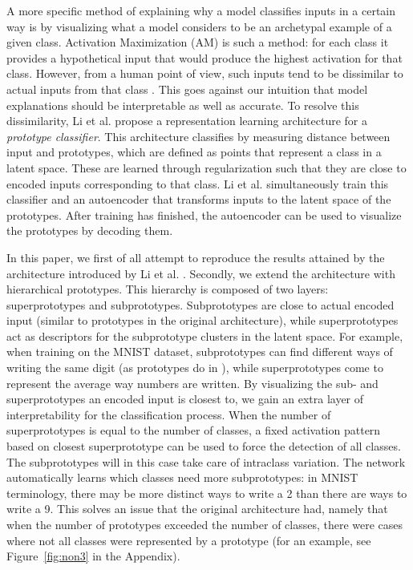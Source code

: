 A more specific method of explaining why a model classifies inputs in a certain way is by visualizing what a model considers to be an archetypal example of a given class. Activation Maximization (AM) \citep{activationmaximization} is such a method: for each class it provides a hypothetical input that would produce the highest activation for that class. However, from a human point of view, such inputs tend to be dissimilar to actual inputs from that class  \citep{activationmaximization}. This goes against our intuition that model explanations should be interpretable as well as accurate. To resolve this dissimilarity, Li et al. \citep{li2018deep} propose a representation learning architecture for a \textit{prototype classifier}. This architecture classifies by measuring distance between input and prototypes, which are defined as points that represent a class in a latent space. These are learned through regularization such that they are close to encoded inputs corresponding to that class. Li et al. simultaneously train this classifier and an autoencoder \citep{autoencoderpaper} that transforms inputs to the latent space of the prototypes. After training has finished, the autoencoder can be used to visualize the prototypes by decoding them.

In this paper, we first of all attempt to reproduce the results attained by the architecture introduced by Li et al. \citep{li2018deep}. Secondly, we extend the architecture with hierarchical prototypes. This hierarchy is composed of two layers: superprototypes and subprototypes. Subprototypes are close to actual encoded input (similar to prototypes in the original architecture), while superprototypes act as descriptors for the subprototype clusters in the latent space. For example, when training on the MNIST dataset, subprototypes can find different ways of writing the same digit (as prototypes do in \citep{li2018deep}), while superprototypes come to represent the average way numbers are written. By visualizing the sub- and superprototypes an encoded input is closest to, we gain an extra layer of interpretability for the classification process. When the number of superprototypes is equal to the number of classes, a fixed activation pattern based on closest superprototype can be used to force the detection of all classes. The subprototypes will in this case take care of intraclass variation. The network automatically learns which classes need more subprototypes: in MNIST terminology, there may be more distinct ways to write a 2 than there are ways to write a 9. This solves an issue that the original architecture \citep{li2018deep} had, namely that when the number of prototypes exceeded the number of classes, there were cases where not all classes were represented by a prototype (for an example, see Figure~\ref{fig:non3} in the Appendix).

